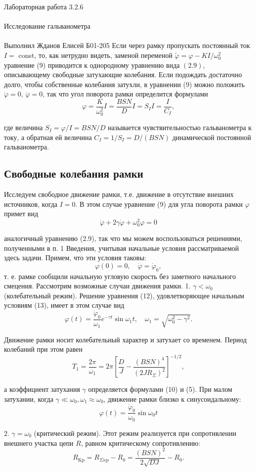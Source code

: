 \documentclass{astroedu-lab}
\begin{document}
\begin{problem}{\huge Лабораторная работа 3.2.6\\\\Исследование гальванометра\\\\Выполнил Жданов Елисей Б01-205}
Если через рамку пропускать постоянный ток $I=$ const, то, как нетрудно видеть, заменой переменой $\tilde{\varphi}=\varphi-K I / \omega_0^2$ уравнение (9) приводится к однородному уравнению вида $(2.9)$, описывающему свободные затухающие колебания. Если подождать достаточно долго, чтобы собственные колебания затухли, в уравнении (9) можно положить $\dot{\varphi}=0$, $\ddot{\varphi}=0$, так что угол поворота рамки определится формулами
$$
\varphi=\frac{K}{\omega_0^2} I=\frac{B S N}{D} I=S_I I=\frac{I}{C_I},
$$

где величина $S_I=\varphi / I=B S N / D$ называется чувствительностью гальванометра к току, а обратная ей величина $C_I=1 / S_I=D /(B S N)$ динамической постоянной гальванометра.

\subsection{Свободные колебания рамки}

Исследуем свободное движение рамки, т.е. движение в отсутствие внешних источников, когда $I=0$. В этом случае уравнение (9) для угла поворота рамки $\varphi$ примет вид
$$
\ddot{\varphi}+2 \gamma \dot{\varphi}+\omega_0^2 \varphi=0
$$

аналогичный уравнению (2.9), так что мы можем воспользоваться решениями, полученными в п. 1 Введения, учитывая начальные условия рассматриваемой здесь задачи. Примем, что эти условия таковы:
$$
\varphi(0)=0, \quad \dot{\varphi}=\dot{\varphi}_0,
$$
т. е. рамке сообщили начальную угловую скорость без заметного начального смецения. Рассмотрим возможные случаи движения рамки.
1. $\gamma<\omega_0$ (колебательный режим). Решение уравнения (12), удовлетворяющее начальным условиям (13), имеет в этом случае вид
$$
\varphi(t)=\frac{\dot{\varphi}_0}{\omega_1} e^{-\gamma t} \sin \omega_1 t, \quad \omega_1=\sqrt{\omega_0^2-\gamma^2} .
$$

Движение рамки носит колебательный характер и затухает со временем. Период колебаний при этом равен
$$
T_1=\frac{2 \pi}{\omega_1}=2 \pi\left[\frac{D}{J}-\frac{(B S N)^4}{\left(2 J R_{\Sigma}\right)^2}\right]^{-1 / 2},
$$

а коэффициент затухания $\gamma$ определяется формулами (10) и (5). При малом затухании, когда $\gamma \ll \omega_0, \omega_1 \approx \omega_0$, движение рамки близко к синусоидальному:
$$
\varphi(t)=\frac{\dot{\varphi}_0}{\omega_0} \sin \omega_0 t
$$

2. $\gamma=\omega_0$ (критический режим). Этот режим реализуется при сопротивлении внешнего участка цепи $R$, равном критическому сопротивлению:
$$
R_{\mathrm{Kp}}=R_{\Sigma \kappa \mathrm{p}}-R_0=\frac{(B S N)^2}{2 \sqrt{D J}}-R_0 .
$$


\end{problem}
\end{document}
